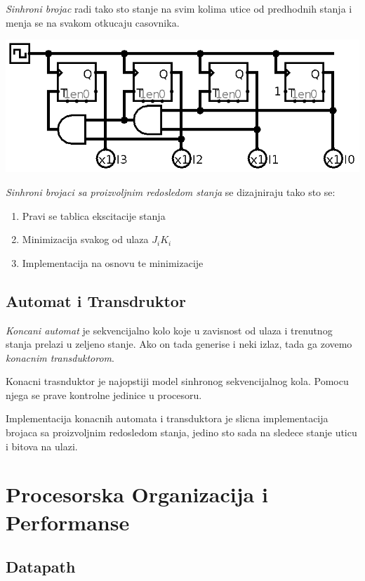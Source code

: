 \documentclass[12p,a4paper]{article}
\begin{document}
\begin{multicols}{2}
    \emph{Sinhroni brojac} radi tako sto stanje na svim kolima utice od 
    predhodnih stanja i menja se na svakom otkucaju casovnika.

    \includegraphics[width=0.9\columnwidth]{Figures/sinhroni.png}

    \emph{Sinhroni brojaci sa proizvoljnim redosledom stanja} se dizajniraju
    tako sto se:    
    \begin{enumerate}
        \itemsep0em
        \item Pravi se tablica ekscitacije stanja
        \item Minimizacija svakog od ulaza $J_i K_i$
        \item Implementacija na osnovu te minimizacije
    \end{enumerate}

    \subsection{Automat i Transdruktor}

    \emph{Koncani automat} je sekvencijalno kolo koje u zavisnost od ulaza i
    trenutnog stanja prelazi u zeljeno stanje. Ako on tada generise i neki
    izlaz, tada ga zovemo \emph{konacnim transduktorom}. 

    Konacni trasnduktor je najopstiji model sinhronog sekvencijalnog kola.
    Pomocu njega se prave kontrolne jedinice u procesoru.

    Implementacija konacnih automata i transduktora je slicna implementacija 
    brojaca sa proizvoljnim redosledom stanja, jedino sto sada na sledece
    stanje uticu i bitova na ulazi.

    \section{Procesorska Organizacija i Performanse}

    \subsection{Datapath}
        

\end{multicols}
\end{document}
